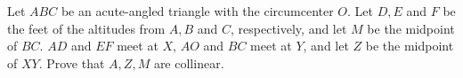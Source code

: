 Let $ABC$ be an acute-angled triangle with the circumcenter $O$. Let $D,E$ and $F$ be the feet of the altitudes from $A,B$ and $C$, respectively, and let $M$ be the midpoint of $BC$. $AD$ and $EF$ meet at $X$, $AO$ and $BC$ meet at $Y$, and let $Z$ be the midpoint of $XY$. Prove that $A,Z,M$ are collinear.